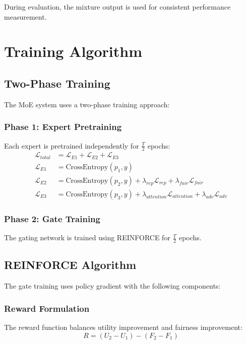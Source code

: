 \documentclass[11pt]{article}
\begin{document}
During evaluation, the mixture output is used for consistent performance measurement.

\section{Training Algorithm}

\subsection{Two-Phase Training}
The MoE system uses a two-phase training approach:

\subsubsection{Phase 1: Expert Pretraining}
Each expert is pretrained independently for $\frac{T}{2}$ epochs:
\begin{align}
    \mathcal{L}_{total} &= \mathcal{L}_{E1} + \mathcal{L}_{E2} + \mathcal{L}_{E3} \\
    \mathcal{L}_{E1} &= \text{CrossEntropy}(p_1, y) \\
    \mathcal{L}_{E2} &= \text{CrossEntropy}(p_2, y) + \lambda_{rep} \mathcal{L}_{rep} + \lambda_{fair} \mathcal{L}_{fair} \\
    \mathcal{L}_{E3} &= \text{CrossEntropy}(p_3, y) + \lambda_{attention} \mathcal{L}_{attention} + \lambda_{adv} \mathcal{L}_{adv}
\end{align}

\subsubsection{Phase 2: Gate Training}
The gating network is trained using REINFORCE for $\frac{T}{2}$ epochs.

\subsection{REINFORCE Algorithm}
The gate training uses policy gradient with the following components:

\subsubsection{Reward Formulation}
The reward function balances utility improvement and fairness improvement:
\begin{equation}
    R = (U_2 - U_1) - (F_2 - F_1)
\end{equation}
\end{document}
